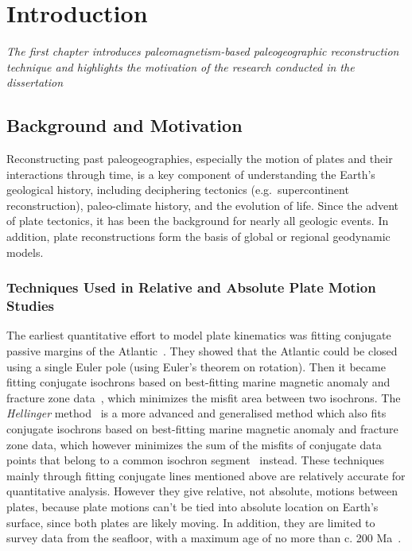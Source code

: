 \chapter{Introduction}\label{chap:Intro}
\textit{The first chapter introduces paleomagnetism-based paleogeographic
reconstruction technique and highlights the motivation of the research conducted
in the dissertation}
\vfill
\minitoc\newpage

\section{Background and Motivation}

Reconstructing past paleogeographies, especially the motion of plates and their
interactions through time, is a key component of understanding the Earth's
geological history, including deciphering tectonics (e.g.\ supercontinent
reconstruction), paleo-climate history, and the evolution of life. Since the
advent of plate tectonics, it has been the background for nearly all geologic
events. In addition, plate reconstructions form the basis of global or regional
geodynamic models.

\subsection{Techniques Used in Relative and Absolute Plate Motion Studies}

The earliest quantitative effort to model plate kinematics was fitting conjugate
passive margins of the Atlantic~\cite{B65,W07}. They showed that the Atlantic
could be closed using a single Euler pole (using Euler's theorem on rotation).
Then it became fitting conjugate isochrons based on best-fitting marine magnetic
anomaly and fracture zone data~\cite{M71}, which minimizes the misfit area
between two isochrons. The \emph{Hellinger} method~\cite{H81} is a more advanced
and generalised method which also fits conjugate isochrons based on best-fitting
marine magnetic anomaly and fracture zone data, which however minimizes the sum
of the misfits of conjugate data points that belong to a common isochron
segment~\cite{W07} instead. These techniques mainly through fitting conjugate
lines mentioned above are relatively accurate for quantitative analysis. However
they give relative, not absolute, motions between plates, because plate motions
can't be tied into absolute location on Earth's surface, since both plates are
likely moving. In addition, they are limited to survey data from the seafloor,
with a maximum age of no more than c. 200 Ma~\cite{M08}.


